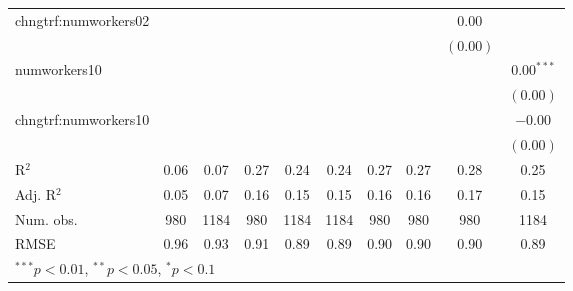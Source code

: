 \begin{table}
\begin{center}
\begin{tabular}{l c c c c c c c c c }
chngtrf:numworkers02 &              &              &              &              &              &              &              & $0.00$       &              \\
                     &              &              &              &              &              &              &              & $(0.00)$     &              \\
numworkers10         &              &              &              &              &              &              &              &              & $0.00^{***}$ \\
                     &              &              &              &              &              &              &              &              & $(0.00)$     \\
chngtrf:numworkers10 &              &              &              &              &              &              &              &              & $-0.00$      \\
                     &              &              &              &              &              &              &              &              & $(0.00)$     \\
\hline
R$^2$                & 0.06         & 0.07         & 0.27         & 0.24         & 0.24         & 0.27         & 0.27         & 0.28         & 0.25         \\
Adj. R$^2$           & 0.05         & 0.07         & 0.16         & 0.15         & 0.15         & 0.16         & 0.16         & 0.17         & 0.15         \\
Num. obs.            & 980          & 1184         & 980          & 1184         & 1184         & 980          & 980          & 980          & 1184         \\
RMSE                 & 0.96         & 0.93         & 0.91         & 0.89         & 0.89         & 0.90         & 0.90         & 0.90         & 0.89         \\
\hline
\multicolumn{10}{l}{\scriptsize{$^{***}p<0.01$, $^{**}p<0.05$, $^*p<0.1$}}
\end{tabular}
\label{table:coefficients}
\end{center}
\end{table}

